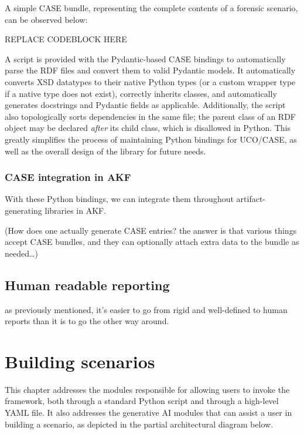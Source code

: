 \documentclass[letterpaper,12pt]{report}
\begin{document}
A simple CASE bundle, representing the complete contents of a forensic
scenario, can be observed below:

REPLACE CODEBLOCK HERE

A script is provided with the Pydantic-based CASE bindings to
automatically parse the RDF files and convert them to valid Pydantic
models. It automatically converts XSD datatypes to their native Python
types (or a custom wrapper type if a native type does not exist),
correctly inherits classes, and automatically generates docstrings and
Pydantic fields as applicable. Additionally, the script also
topologically sorts dependencies in the same file; the parent class of
an RDF object may be declared \emph{after} its child class, which is
disallowed in Python. This greatly simplifies the process of maintaining
Python bindings for UCO/CASE, as well as the overall design of the
library for future needs.

\subsection{CASE integration in
AKF}\label{case-integration-in-akf}

With these Python bindings, we can integrate them throughout
artifact-generating libraries in AKF.

(How does one actually generate CASE entries? the answer is that various
things accept CASE bundles, and they can optionally attach extra data to
the bundle as needed\ldots)

\section{Human readable reporting}\label{human-readable-reporting}

as previously mentioned, it's easier to go from rigid and well-defined
to human reports than it is to go the other way around.

\chapter{Building scenarios}\label{chapter-six}

This chapter addresses the modules responsible for allowing users to
invoke the framework, both through a standard Python script and through
a high-level YAML file. It also addresses the generative AI modules that
can assist a user in building a scenario, as depicted in the partial
architectural diagram below.
\end{document}
